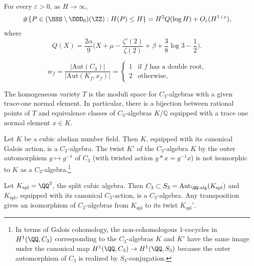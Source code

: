 \begin{corollary}\label{cor:integralPointCount} For every $\varepsilon>0$, as $H\to\infty$, \[ \#\{P\in(\SSS\setminus\DDD_0)(\ZZ):H(P)\leq H\} =H^2Q(\log H)+O_\varepsilon(H^{1+\varepsilon}), \] where \begin{equation} Q(X)=\frac{2\alpha}{9} \biggl(X+\mu-\frac{\zeta'(2)}{\zeta(2)} +\beta+\frac38\log3-\frac12\biggr). \end{equation} \end{corollary}

\begin{equation}\label{eqn:polynomialWeights} w_f=\frac{|\mathrm{Aut}(C_3)|}{|\mathrm{Aut}(K_f,x_f)|}= \begin{cases} 1 &\text{if $f$ has a double root,}\\ 2 &\text{otherwise,} \end{cases} \end{equation}

\begin{theorem}\label{thm:modularInterpretation} The homogeneous variety $T$ is the moduli space for $C_3$-algebras with a given trace-one normal element. In particular, there is a bijection between rational points of $T$ and equivalence classes of $C_3$-algebras $K/\mathbb Q$ equipped with a trace one normal element $x \in K$. \end{theorem}

\begin{example}\label{example:twoRationalPointsSamePoly} Let $K$ be a cubic abelian number field. Then $K$, equipped with its canonical Galois action, is a $C_3$-algebra. The twist $K'$ of the $C_3$-algebra $K$ by the outer automorphism $g \mapsto g^{-1}$ of $C_3$ (with twisted action $g \ast x = g^{-1}x$) is not isomorphic to $K$ as a $C_3$-algebra.\footnote{ In terms of Galois cohomology, the non-cohomologous $1$-cocycles in $H^1(\QQ,C_3)$ corresponding to the $C_3$-algebras $K$ and $K'$ have the same image under the canonical map $H^1(\QQ,C_3) \to H^1(\QQ,S_3)$ because the outer automorphism of $C_3$ is realized by $S_3$-conjugation.} \end{example}

\begin{example}\label{example:splitAlgebra} Let $K_{\text{spl}} = \QQ^3$, the split cubic algebra. Then $C_3\subset S_3 = \mathrm{Aut}_{\text{$\QQ$-alg}}(K_{\text{spl}})$ and $K_{\text{spl}}$, equipped with its canonical $C_3$-action, is a $C_3$-algebra. Any transposition gives an isomorphism of $C_3$-algebras from $K_{\text{spl}}$ to its twist $K_{\text{spl}}'$. \end{example}

